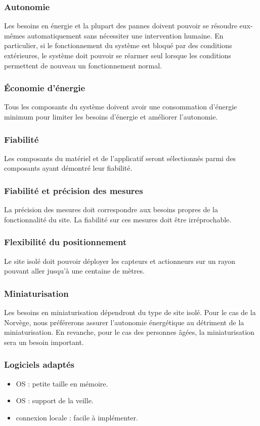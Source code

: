 \documentclass[a4paper, 11pt]{article}
\begin{document}
	\subsubsection{Autonomie}
		Les besoins en énergie et la plupart des pannes doivent pouvoir se résoudre eux-mêmes automatiquement sans nécessiter une intervention humaine. En particulier, si le fonctionnement du système est bloqué par des conditions extérieures, le système doit pouvoir se réarmer seul lorsque les conditions permettent de nouveau un fonctionnement normal.
	\subsubsection{Économie d'énergie}
		Tous les composants du système doivent avoir une consommation d'énergie minimum pour limiter les besoins d'énergie et améliorer l'autonomie.
	\subsubsection{Fiabilité}
		Les composants du matériel et de l'applicatif seront sélectionnés parmi des composants ayant démontré leur fiabilité.
	\subsubsection{Fiabilité et précision des mesures}
		La précision des mesures doit correspondre aux besoins propres de la fonctionnalité du site. La fiabilité sur ces mesures doit être irréprochable.
	\subsubsection{Flexibilité du positionnement}
		Le site isolé doit pouvoir déployer les capteurs et actionneurs sur un rayon pouvant aller jusqu'à une centaine de mètres.
	\subsubsection{Miniaturisation}
		Les besoins en miniaturisation dépendront du type de site isolé. Pour le cas de la Norvège, nous préférerons assurer l'autonomie énergétique au détriment de la miniaturisation. En revanche, pour le cas des personnes âgées, la miniaturisation sera un besoin important.
	\subsubsection{Logiciels adaptés}
		\begin{itemize}
			\item OS : petite taille en mémoire.
			\item OS : support de la veille.
			\item connexion locale : facile à implémenter.
	\end{itemize}
	
\end{document}
